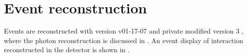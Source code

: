 \section{Event reconstruction}
\label{sec:tauReco}

Events are reconstructed with  \ilcsoft version v01-17-07 \cite{Gaede:82475} and private modified \pandora version 3 \cite{Marshall:2015rfa}, where the photon reconstruction is discussed in . An event display of \eeToTauTau interaction reconstructed in the \ILD detector is shown in .



